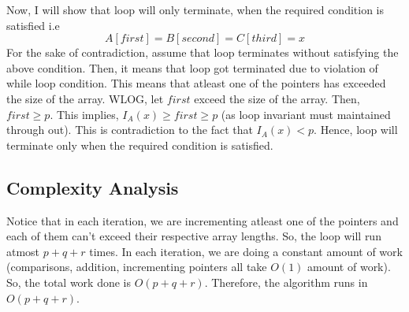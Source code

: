 \documentclass{article}
\begin{document}
Now, I will show that loop will only terminate, when the required condition is satisfied i.e $$A[first] = B[second] = C[third] = x$$
For the sake of contradiction, assume that loop terminates without satisfying the above condition. Then, it means that loop got terminated due to violation of while loop condition. This means that atleast one of the pointers has exceeded the size of the array. WLOG, let $first$ exceed the size of the array. Then, $first \geq p$. This implies, $I_A(x) \geq first \geq p$ (as loop invariant must maintained through out). This is contradiction to the fact that $I_A(x) < p$. Hence, loop will terminate only when the required condition is satisfied.

\subsection*{Complexity Analysis}
Notice that in each iteration, we are incrementing atleast one of the pointers and each of them can't exceed their respective array lengths. So, the loop will run atmost $p + q + r$ times. In each iteration, we are doing a constant amount of work (comparisons, addition, incrementing pointers all take $O(1)$ amount of work). So, the total work done is $O(p + q + r)$. Therefore, the algorithm runs in $O(p + q + r)$.
\end{document}

